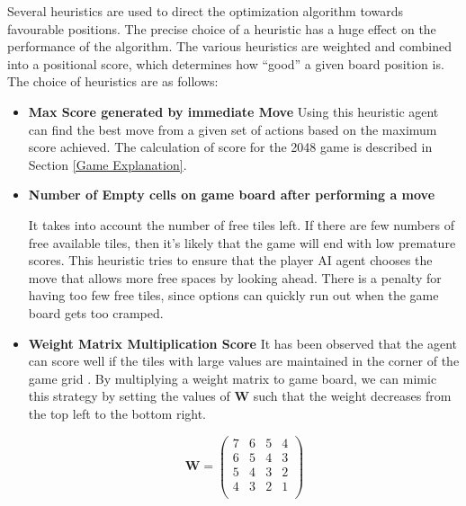 \documentclass{svproc}
\begin{document}
    Several heuristics are used to direct the optimization algorithm towards favourable positions. The precise choice of a heuristic has a huge effect on the performance of the algorithm. The various heuristics are weighted and combined into a positional score, which determines how ``good'' a given board position is. The choice of heuristics are as follows:

    \begin{itemize}
        \item \textbf{{Max Score generated by immediate Move}}
        Using this heuristic agent can find the best move from a given set of actions based on the maximum score achieved. The calculation of score for the 2048 game is described in Section \ref{Game Explanation}.


        \item {\textbf{Number of Empty cells on game board after performing a move}}

        It takes into account the number of free tiles left. If there are few numbers of free available tiles, then it’s likely that the game will end with low premature scores. This heuristic tries to ensure that the player AI agent chooses the move that allows more free spaces by looking ahead. There is a penalty for having too few free tiles, since options can quickly run out when the game board gets too cramped.

        \item {\textbf{Weight Matrix Multiplication Score}}
        It has been observed that the agent can score well if the tiles with large values are maintained in the corner of the game grid \cite{blog_2048_weight_matrix}. By multiplying a weight matrix to game board, we can mimic this strategy by setting the values of \textbf{W} such that the weight decreases from the top left to the bottom right.

        \begin{equation}
            \textbf{W} =
            \begin{pmatrix}
                7 & 6 & 5 & 4 \\
                6 & 5 & 4 & 3\\
                5 & 4 & 3 & 2 \\
                4 & 3 & 2 & 1 \\
            \end{pmatrix}
        \end{equation}


\end{itemize}
\end{document}
